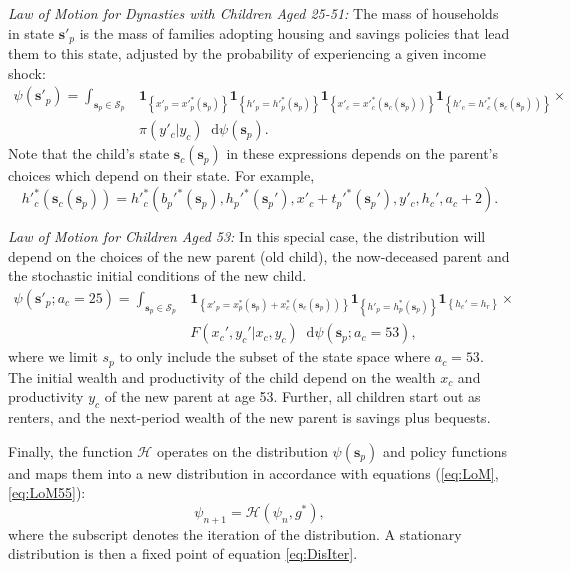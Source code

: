\documentclass[12pt]{article}
\newcommand*\diff{\mathop{}\!\mathrm{d}}
\begin{document}
\textit{Law of Motion for Dynasties with Children Aged 25-51:} The mass of households in state $\mathbf{s}'_p$ is the mass of families adopting housing and savings policies that lead them to this state, adjusted by the probability of experiencing a given income shock:
\begin{equation}\label{eq:LoM}
\begin{split}
\psi(\mathbf{s}'_p) = \int_{\mathbf{s}_p\in \mathcal{S}_p} & 
\mathbf{1}_{\left\{ x'_p = x'^*_p(\mathbf s_p) \right\} }
\mathbf{1}_{\left\{ h'_p = h'^*_p(\mathbf s_p) \right\} } 
\mathbf{1}_{\left\{ x'_c = x'^*_c(\mathbf s_c(\mathbf s_p))\right\}} 
\mathbf{1}_{\left\{ h'_c = h'^*_c(\mathbf s_c(\mathbf s_p))\right\}} \times \\
&\pi(y'_c|y_c)\diff \psi(\mathbf s_p).
\end{split}
\end{equation}
Note that the child's state $\mathbf{s}_c(\mathbf{s}_p)$ in these expressions depends on the parent's choices which depend on their state. For example, 
\begin{equation}
h'^*_c\left(\mathbf s_c(\mathbf s_p)\right) =h'^*_c\left(b_p'^*(\mathbf{s}_p),h_p'^*(\mathbf{s}_p'),x'_c + t_p'^*(\mathbf{s}_p'),y'_c,h_c',a_c+2 \right).
\end{equation}

\textit{Law of Motion for Children Aged 53:} In this special case, the distribution will depend on the choices of the new parent (old child), the now-deceased parent and the stochastic initial conditions of the new child. 
\begin{equation}\label{eq:LoM55}
\begin{split}
\psi(\mathbf{s}'_p;a_c=25) = \int_{\mathbf{s}_p\in \mathcal{S}_p} & 
\mathbf{1}_{\left\{ x'_p = x^*_p(\mathbf s_p) + x^*_c(\mathbf s_c(\mathbf s_p)) \right\} }
\mathbf{1}_{\left\{ h'_p = h^*_p(\mathbf s_p) \right\} } 
\mathbf{1}_{\left\{ h_c' = h_r\right\}} \times \\
&F(x_c',y_c'|x_c,y_c) \diff \psi(\mathbf s_p;a_c=53),
\end{split}
\end{equation}
where we limit $s_p$ to only include the subset of the state space where $a_c=53$. The initial wealth and productivity of the child depend on the wealth $x_c$ and productivity $y_c$ of the new parent at age 53. Further, all children start out as renters, and the next-period wealth of the new parent is savings plus bequests.

Finally, the function $\mathcal{H}$ operates on the distribution $\psi(\mathbf{s}_p)$ and policy functions %
and maps them into a new distribution in accordance with equations (\ref{eq:LoM}, \ref{eq:LoM55}):
\begin{equation}\label{eq:DisIter}
\psi_{n+1} = \mathcal{H}(\psi_n,g^*),
\end{equation}
where the subscript denotes the iteration of the distribution. A stationary distribution is then a fixed point of equation \ref{eq:DisIter}.
\end{document}
